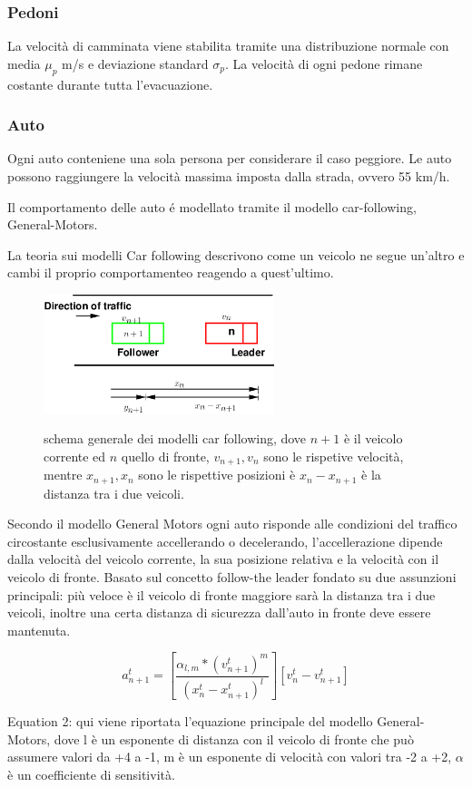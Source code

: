 \subsubsection{Pedoni}
La velocità di camminata viene stabilita tramite una distribuzione normale
con media $\mu_p$ m/s e deviazione standard $\sigma_p$.
La velocità di ogni pedone rimane costante durante tutta l'evacuazione.


\newpage
\subsubsection{Auto}
Ogni auto conteniene una sola persona per considerare il caso peggiore.
Le auto possono raggiungere la velocità massima imposta dalla strada, ovvero 55 km/h.

Il comportamento delle auto é modellato tramite il modello car-following, General-Motors.

La teoria sui modelli Car following descrivono come un veicolo ne segue un'altro
e cambi il proprio comportamenteo reagendo a quest'ultimo.

\begin{figure}[ht]
  \centering
  \includegraphics[width=0.6\textwidth]{images/GM.png}
  \label{fig:general-motors-img}
  \caption{schema generale dei modelli car following, dove $n+1$ è il veicolo corrente ed $n$ quello di fronte, $v_{n+1}, v_{n}$ sono le rispetive velocità, mentre $x_{n+1}, x_{n}$ sono le rispettive posizioni è $x_{n} - x_{n + 1}$ è la distanza tra i due veicoli.}
\end{figure}

Secondo il modello General Motors ogni auto risponde alle condizioni del traffico circostante esclusivamente accellerando o decelerando, l'accellerazione dipende dalla velocità del veicolo corrente, la sua posizione relativa e la velocità con il veicolo di fronte.
Basato sul concetto follow-the leader fondato su due assunzioni principali:
più veloce è il veicolo di fronte maggiore sarà la distanza tra i due veicoli,
inoltre una certa distanza di sicurezza dall'auto in fronte deve essere mantenuta.

\begin{equation}
  a_{n+1}^{t} = [ \frac{\alpha_{l, m} * (v_{n + 1}^{t})^{m} }{ (x_{n}^{t} - x_{n + 1}^{t})^{l}}][v_{n}^{t} - v_{n + 1}^{t}]
  \label{eq:general-motors-eq}
\end{equation}

\noindent
Equation 2: qui viene riportata l'equazione principale del modello General-Motors,
dove l è un esponente di distanza con il veicolo di fronte che può assumere valori da +4 a -1,
m è un esponente di velocità con valori tra -2 a +2, $\alpha$ è un coefficiente di sensitività.
